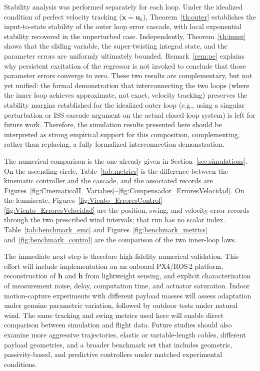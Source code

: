 \documentclass[sn-mathphys-num]{sn-jnl}
\theoremstyle{thmstyleone}%
\theoremstyle{thmstyletwo}%
\theoremstyle{thmstylethree}%
\begin{document}
Stability analysis was performed separately for each loop. Under the idealized condition of perfect velocity tracking ($\dot{\mathbf{x}}=\mathbf{u}_k$), Theorem~\ref{th:outer} establishes the input-to-state stability of the outer loop error cascade, with local exponential stability recovered in the unperturbed case. Independently, Theorem~\ref{th:inner} shows that the sliding variable, the super-twisting integral state, and the parameter errors are uniformly ultimately bounded. Remark~\ref{rem:pe} explains why persistent excitation of the regressor is not invoked to conclude that those parameter errors converge to zero. These two results are complementary, but not yet unified: the formal demonstration that interconnecting the two loops (where the inner loop achieves approximate, not exact, velocity tracking) preserves the stability margins established for the idealized outer loop (e.g., using a singular perturbation or ISS cascade argument on the actual closed-loop system) is left for future work. Therefore, the simulation results presented here should be interpreted as strong empirical support for this composition, complementing, rather than replacing, a fully formalized interconnection demonstration.

The numerical comparison is the one already given in Section~\ref{sec:simulations}. On the ascending circle, Table~\ref{tab:metrics} is the difference between the kinematic controller and the cascade, and the associated records are Figures~\ref{fig:CinematicoII_Variabes}--\ref{fig:Compensador_ErroresVelocidad}. On the lemniscate, Figures~\ref{fig:Viento_ErroresControl}--\ref{fig:Viento_ErroresVelocidad} are the position, swing, and velocity-error records through the two prescribed wind intervals; that run has no scalar index. Table~\ref{tab:benchmark_smc} and Figures~\ref{fig:benchmark_metrics} and~\ref{fig:benchmark_control} are the comparison of the two inner-loop laws.

The immediate next step is therefore high-fidelity numerical validation. This effort will include implementation on an onboard PX4/ROS\,2 platform, reconstruction of $\mathbf{h}$ and $\dot{\mathbf{h}}$ from lightweight sensing, and explicit characterization of measurement noise, delay, computation time, and actuator saturation. Indoor motion-capture experiments with different payload masses will assess adaptation under genuine parametric variation, followed by outdoor tests under natural wind. The same tracking and swing metrics used here will enable direct comparison between simulation and flight data. Future studies should also examine more aggressive trajectories, elastic or variable-length cables, different payload geometries, and a broader benchmark set that includes geometric, passivity-based, and predictive controllers under matched experimental conditions.
\end{document}
